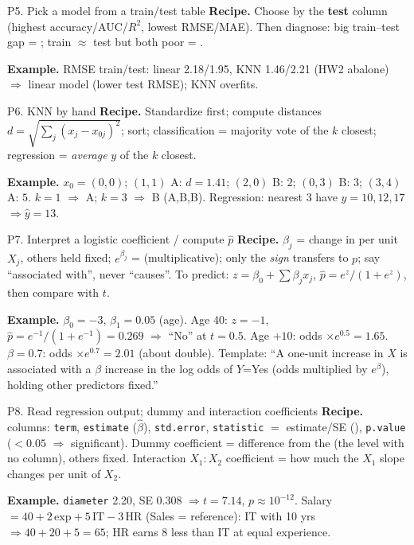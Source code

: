 \begin{topic}{P5. Pick a model from a train/test table }
\textbf{Recipe.} Choose by the \textbf{test} column (highest accuracy/AUC/$R^2$, lowest RMSE/MAE). Then diagnose:
big train--test gap = ; train $\approx$ test but both poor = .
\par\textbf{Example.} RMSE train/test: linear 2.18/1.95, KNN 1.46/2.21 (HW2 abalone) $\Rightarrow$ linear model
(lower test RMSE); KNN overfits.
\end{topic}

\begin{topic}{P6. KNN by hand }
\textbf{Recipe.} Standardize first; compute distances $d=\sqrt{\sum_j(x_{j}-x_{0j})^2}$; sort; classification =
majority vote of the $k$ closest; regression = \emph{average} $y$ of the $k$ closest.
\par\textbf{Example.} $x_0=(0,0)$; $(1,1)$ A: $d=1.41$; $(2,0)$ B: $2$; $(0,3)$ B: $3$; $(3,4)$ A: $5$.
$k=1$ $\Rightarrow$ A; $k=3$ $\Rightarrow$ B (A,B,B). Regression: nearest 3 have $y=10,12,17$ $\Rightarrow\hat y=13$.
\end{topic}

\begin{topic}{P7. Interpret a logistic coefficient / compute $\hat p$ }
\textbf{Recipe.} $\beta_j$ = change in  per unit $X_j$, others held fixed; $e^{\beta_j}$ = 
(multiplicative); only the \emph{sign} transfers to $p$; say ``associated with'', never ``causes''. To predict:
$z=\beta_0+\sum\beta_jx_j$, $\hat p=e^z/(1+e^z)$, then compare with $t$.
\par\textbf{Example.} $\beta_0=-3$, $\beta_1=0.05$ (age). Age 40: $z=-1$, $\hat p=e^{-1}/(1+e^{-1})=0.269$
$\Rightarrow$ ``No'' at $t=0.5$. Age $+10$: odds $\times e^{0.5}=1.65$. $\beta=0.7$: odds $\times e^{0.7}=2.01$ (about double).
Template: ``A one-unit increase in $X$ is associated with a $\beta$ increase in the log odds of $Y$=Yes
(odds multiplied by $e^{\beta}$), holding other predictors fixed.''
\end{topic}

\begin{topic}{P8. Read regression output; dummy and interaction coefficients }
\textbf{Recipe.}  columns: \texttt{term}, \texttt{estimate} ($\hat\beta$), \texttt{std.error},
\texttt{statistic} $=$ estimate/SE (), \texttt{p.value} ($<0.05$ $\Rightarrow$ significant).
Dummy coefficient = difference from the  (the level with no column), others fixed.
Interaction $X_1{:}X_2$ coefficient = how much the $X_1$ slope changes per unit of $X_2$.
\par\textbf{Example.} \texttt{diameter} 2.20, SE 0.308 $\Rightarrow t=7.14$, $p\approx10^{-12}$. Salary $=40+2\,\text{exp}+5\,
\text{IT}-3\,\text{HR}$ (Sales = reference): IT with 10 yrs $\Rightarrow 40+20+5=65$; HR earns 8 less than IT at equal
experience.
\end{topic}

